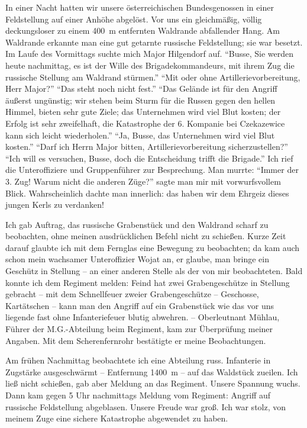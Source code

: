 In einer Nacht hatten wir unsere österreichischen Bundesgenossen in einer Feldstellung auf einer Anhöhe abgelöst. Vor uns ein gleichmäßig, völlig deckungsloser zu einem 400~m entfernten Waldrande abfallender Hang. Am Waldrande erkannte man eine gut getarnte russische Feldstellung; sie war besetzt. Im Laufe des Vormittags suchte mich Major Hilgendorf auf. \enquote{Busse, Sie werden heute nachmittag, es ist der Wille des Brigadekommandeurs, mit ihrem Zug die russische Stellung am Waldrand stürmen.} \enquote{Mit oder ohne Artillerievorbereitung, Herr Major?} \enquote{Das steht noch nicht fest.} \enquote{Das Gelände ist für den Angriff äußerst ungünstig; wir stehen beim Sturm für die Russen gegen den hellen Himmel, bieten sehr gute Ziele; das Unternehmen wird viel Blut kosten; der Erfolg ist sehr zweifelhaft, die Katastrophe der 6. Kompanie bei Czekazewice kann sich leicht wiederholen.} \enquote{Ja, Busse, das Unternehmen wird viel Blut kosten.} \enquote{Darf ich Herrn Major bitten, Artillerievorbereitung sicherzustellen?} \enquote{Ich will es versuchen, Busse, doch die Entscheidung trifft die Brigade.} Ich rief die Unteroffiziere und Gruppenführer zur Besprechung. Man murrte: \enquote{Immer der 3. Zug! Warum nicht die anderen Züge?} sagte man mir mit vorwurfsvollem Blick. Wahrscheinlich dachte man innerlich: das haben wir dem Ehrgeiz dieses jungen Kerls zu verdanken!

Ich gab Auftrag, das russische Grabenstück und den Waldrand scharf zu beobachten, ohne meinen ausdrücklichen Befehl nicht zu schießen. Kurze Zeit darauf glaubte ich mit dem Fernglas eine Bewegung zu beobachten; da kam auch schon mein wachsamer Unteroffizier Wojat an, er glaube, man bringe ein Geschütz in Stellung -- an einer anderen Stelle als der von mir beobachteten. Bald konnte ich dem Regiment melden: Feind hat zwei Grabengeschütze in Stellung gebracht -- mit dem Schnellfeuer zweier Grabengeschütze -- Geschosse, Kartätschen -- kann man den Angriff auf ein Grabenstück wie das vor uns liegende fast ohne Infanteriefeuer blutig abwehren. -- Oberleutnant Mühlau, Führer der M.G.-Abteilung beim Regiment, kam zur Überprüfung meiner Angaben. Mit dem Scherenfernrohr bestätigte er meine Beobachtungen.

Am frühen Nachmittag beobachtete ich eine Abteilung russ. Infanterie in Zugstärke ausgeschwärmt -- Entfernung 1400~m -- auf das Waldstück zueilen. Ich ließ nicht schießen, gab aber Meldung an das Regiment. Unsere Spannung wuchs. Dann kam gegen 5 Uhr nachmittags Meldung vom Regiment: Angriff auf russische Feldstellung abgeblasen. Unsere Freude war groß. Ich war stolz, von meinem Zuge eine sichere Katastrophe abgewendet zu haben. 

